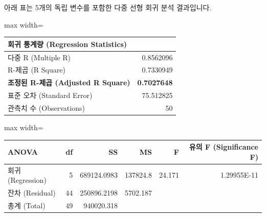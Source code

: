 \documentclass[11pt,a4paper]{article}
\begin{document}
\begin{tcolorbox}[title=\textbf{Excel 출력: 다중 선형 회귀 분석 (초기 모델)}]
아래 표는 5개의 독립 변수를 포함한 다중 선형 회귀 분석 결과입니다.

\begin{adjustbox}{max width=\textwidth}
\begin{tabular}{l r}
\toprule
\textbf{회귀 통계량 (Regression Statistics)} & \\
\midrule
다중 R (Multiple R) & 0.8562096 \\
R-제곱 (R Square) & 0.7330949 \\
\textbf{조정된 R-제곱 (Adjusted R Square)} & \textbf{0.7027648} \\
표준 오차 (Standard Error) & 75.512825 \\
관측치 수 (Observations) & 50 \\
\bottomrule
\end{tabular}
\end{adjustbox}

\vspace{0.5em}

\begin{adjustbox}{max width=\textwidth}
\begin{tabular}{l r r r r r}
\toprule
\textbf{ANOVA} & \textbf{df} & \textbf{SS} & \textbf{MS} & \textbf{F} & \textbf{유의 F (Significance F)} \\
\midrule
회귀 (Regression) & 5 & 689124.0983 & 137824.8 & 24.171 & 1.29955E-11 \\
잔차 (Residual) & 44 & 250896.2198 & 5702.187 & & \\
총계 (Total) & 49 & 940020.318 & & & \\
\bottomrule
\end{tabular}
\end{adjustbox}

\vspace{0.5em}


\end{tcolorbox}
\end{document}
